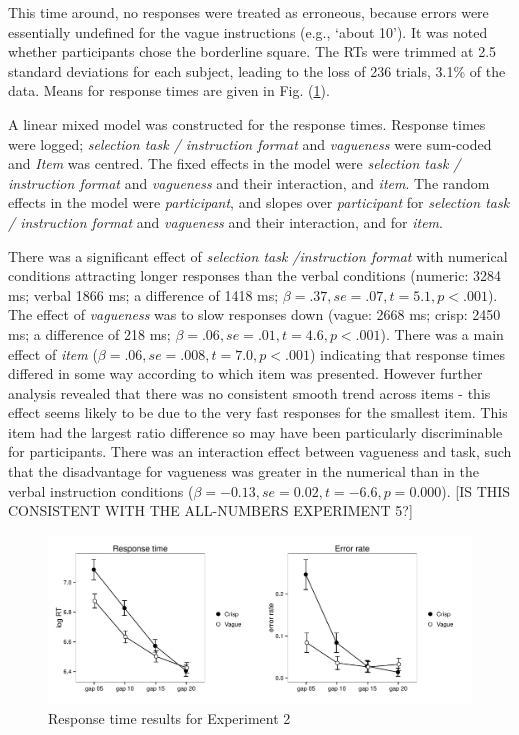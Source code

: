 \documentclass[graybox,envcountchap,sectrefs%
,footinfo
]{svmono}
\begin{document}
This time around, no responses were treated as erroneous, because errors were essentially undefined for the vague instructions (e.g., `about 10'). It was noted whether participants chose the borderline square. 
%
The RTs were trimmed at 2.5 standard deviations for each subject, leading to the loss of 236 trials, 3.1\% of the data. Means for response times are given in Fig. (\ref{resultse2}).

A linear mixed model was constructed for the response times.
%
Response times were logged; \emph{selection task / instruction format} and \emph{vagueness} were sum-coded and \emph{Item} was centred. 
% 
The fixed effects in the model were \emph{selection task / instruction format} and \emph{vagueness} and their interaction, and \emph{item}.
% 
The random effects in the model were \emph{participant}, and slopes over \emph{participant} for \emph{selection task / instruction format} and \emph{vagueness} and their interaction, and for \emph{item}.

There was a significant effect of \emph{selection task /instruction format} with numerical conditions attracting longer responses than the verbal conditions (numeric: 3284 ms; verbal 1866 ms; a difference of 1418 ms; $\beta=.37, se=.07, t=5.1, p<.001$). 
% 
The effect of \emph{vagueness} was to slow responses down (vague: 2668 ms; crisp: 2450 ms; a difference of 218 ms; $\beta=.06, se=.01, t=4.6, p<.001$). 
%
There was a main effect of \emph{item} ($\beta=.06, se=.008, t=7.0, p<.001$) indicating that response times differed in some way according to which item was presented. However further analysis revealed that there was no consistent smooth trend across items - this effect seems likely to be due to the very fast responses for the smallest item. This item had the largest ratio difference so may have been particularly discriminable for participants. %
%
There was an interaction effect between vagueness and task, such that the disadvantage for vagueness was greater in the numerical than in the verbal instruction conditions ($\beta=-0.13, se= 0.02, t= -6.6, p=0.000$).  [IS THIS CONSISTENT WITH THE ALL-NUMBERS EXPERIMENT 5?]

\begin{figure}[b]
\sidecaption
\includegraphics[scale=.5]{images/resultse1}
\caption{Response time results for Experiment 2}
\label{resultse2}
\end{figure}
\end{document}
